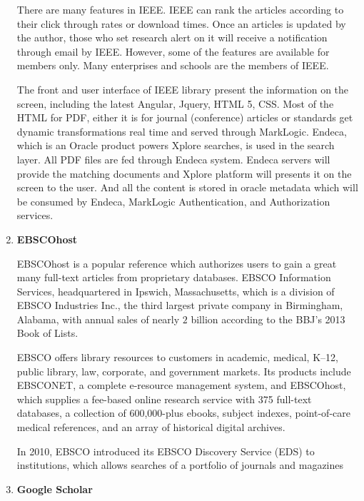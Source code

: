 \begin{enumerate}
	There are many features in IEEE. IEEE can rank the articles according to their click through rates or download times. 
    Once an articles is updated by the author, those who set research alert on it will receive a notification through email by IEEE.
    However, some of the features are available for members only.
    Many enterprises and schools are the members of IEEE.

	
	The front and user interface of IEEE library present the information on the screen, 
	including the latest Angular, Jquery, HTML 5, CSS.
	Most of the HTML for PDF, either it is for journal (conference) articles or standards get dynamic transformations real time and served through MarkLogic.
	Endeca, which is an Oracle product powers Xplore searches, is used in the search layer.
	All PDF files are fed through Endeca system.
	Endeca servers will provide the matching documents and Xplore platform will presents it on the screen to the user.
	And all the content is stored in oracle metadata which will be consumed by Endeca, MarkLogic Authentication, and Authorization services.
	
	\item\textbf{EBSCOhost}
	\setlength{\parindent}{1em}

	EBSCOhost is a popular reference which authorizes users to gain a great many full-text articles from proprietary databases.
	EBSCO Information Services, headquartered in Ipswich, Massachusetts, 
    which is a division of EBSCO Industries Inc., 
    the third largest private company in Birmingham, Alabama, with annual sales of nearly $2$ billion according to the BBJ's 2013 Book of Lists.

    EBSCO offers library resources to customers in academic, medical, K–12,  
    public library, law, corporate, and government markets. 
	Its products include EBSCONET, a complete e-resource management system,
    and EBSCOhost, which supplies a fee-based online research 
    service with 375 full-text databases, a collection
    of 600,000-plus ebooks, subject indexes, point-of-care 
    medical references, and an array of historical digital archives.

    In 2010, EBSCO introduced its EBSCO Discovery Service (EDS) to institutions,
    which allows searches of a portfolio of journals and magazines

	\item\textbf{Google Scholar}
	\setlength{\parindent}{1em}
	

\end{enumerate}

